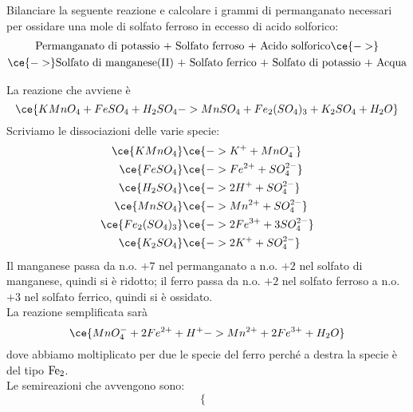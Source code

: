 \begin{esercizio}
    Bilanciare la seguente reazione e calcolare i grammi di permanganato necessari per ossidare una mole di solfato ferroso in eccesso di acido solforico:
    \begin{gather*}
        \text{Permanganato di potassio + Solfato ferroso + Acido solforico} \ce{->}
        \\
        \ce{->} \text{Solfato di manganese(II) + Solfato ferrico + Solfato di potassio + Acqua}
    \end{gather*}
\end{esercizio}
\begin{soluzione}
    La reazione che avviene è
    \begin{equation*}
        \ce{KMnO_4 + FeSO_4 + H_2SO_4 -> MnSO_4 + Fe_2(SO_4)_3 + K_2SO_4 + H_2O}
    \end{equation*}
    Scriviamo le dissociazioni delle varie specie:
    \begin{equation*}
        \begin{split}
            \ce{KMnO_4} & \ce{-> K^+ + MnO_4^-}
            \\
            \ce{FeSO_4} & \ce{-> Fe^{2+} + SO_4^{2-}}
            \\
            \ce{H_2SO_4} & \ce{-> 2H^+ + SO_4^{2-}}
            \\
            \ce{MnSO_4} & \ce{-> Mn^{2+} + SO_4^{2-}}
            \\
            \ce{Fe_2(SO_4)_3} & \ce{-> 2Fe^{3+} + 3SO_4^{2-}}
            \\
            \ce{K_2SO_4} & \ce{-> 2K^+ + SO_4^{2-}}
            \\
        \end{split}
    \end{equation*}
    Il manganese passa da n.o. $+7$ nel permanganato a n.o. $+2$ nel solfato di manganese, quindi si è ridotto; il ferro passa da n.o. $+2$ nel solfato ferroso a n.o. $+3$ nel solfato ferrico, quindi si è ossidato.\\
    La reazione semplificata sarà
    \begin{equation*}
        \ce{MnO_4^- + 2Fe^{2+} + H^+ -> Mn^{2+} + 2Fe^{3+} + H_2O}
    \end{equation*}
    dove abbiamo moltiplicato per due le specie del ferro perché a destra la specie è del tipo $\rm Fe_2$.\\
    Le semireazioni che avvengono sono:
    \begin{equation*}
        \begin{cases}

\end{cases}
\end{equation*}
\end{soluzione}
